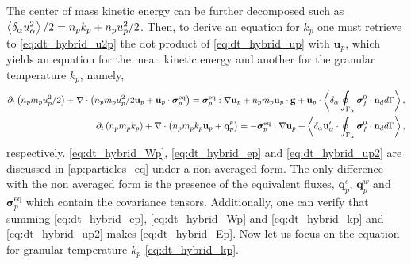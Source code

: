 The center of mass kinetic energy can be further decomposed such as $\left<\delta_\alpha u_\alpha^2\right>/2 = n_p k_p + n_p u_p^2/2$. 
Then, to derive an equation for $k_p$ one must retrieve to \ref{eq:dt_hybrid_u2p} the dot product of \ref{eq:dt_hybrid_up} with $\textbf{u}_p$, which yields an equation for the mean kinetic energy and another for the granular temperature $k_p$, namely,
\begin{align}
    \label{eq:dt_hybrid_up2}
\partial_t \left(n_p m_p u_p^2/ 2\right)
    + \mathbf{\nabla}\cdot \left(n_p
    m_p u_p^2/ 2 \textbf{u}_p 
    + \textbf{u}_p \cdot \bm{\sigma}_p^\text{eq}
    \right)
    = 
    \bm{\sigma}_p^\text{eq}  :\mathbf{\nabla} \textbf{u}_p
    +  n_p m_p \textbf{u}_p \cdot 
     \textbf{g}
    + \textbf{u}_p \cdot \left<\delta_\alpha \oint_{\Gamma_{\alpha}} {\bm{\sigma}_f^0 \cdot \textbf{n}_d} d\Gamma\right>,\\
    \label{eq:dt_hybrid_kp}
    \partial_t \left(n_p m_p k_p\right)
    + \mathbf{\nabla}\cdot \left(n_p
    m_p k_p \textbf{u}_p 
    + \textbf{q}^k_p
    \right)
    = 
    - \bm{\sigma}_p^\text{eq}  :\mathbf{\nabla} \textbf{u}_p
    + \left<\delta_\alpha \textbf{u}_\alpha'\cdot\oint_{\Gamma_{\alpha}} \bm{\sigma}_f^0 \cdot \textbf{n}_d d\Gamma\right>,
\end{align}
respectively.
\ref{eq:dt_hybrid_Wp}, \ref{eq:dt_hybrid_ep} and \ref{eq:dt_hybrid_up2} are discussed in \ref{ap:particles_eq} under a non-averaged form.
The only difference with the non averaged form is the presence of the equivalent fluxes, $\textbf{q}_p^e$, $\textbf{q}_p^w$ and $\bm\sigma^\text{eq}_p$ which contain the covariance tensors. 
Additionally, one can verify that summing \ref{eq:dt_hybrid_ep}, \ref{eq:dt_hybrid_Wp} and \ref{eq:dt_hybrid_kp} and \ref{eq:dt_hybrid_up2} makes \ref{eq:dt_hybrid_Ep}.  
Now let us focus on the equation for granular temperature $k_p$ \eqref{eq:dt_hybrid_kp}. 

